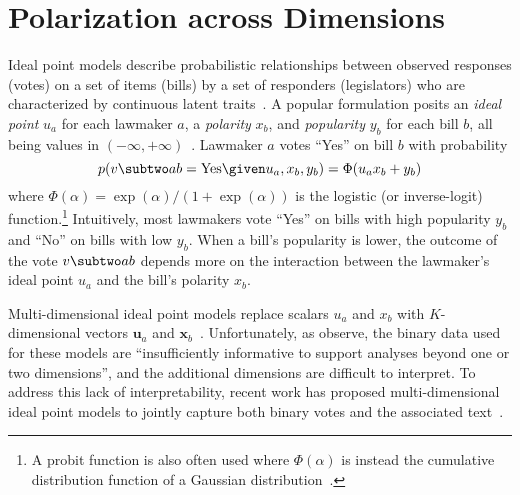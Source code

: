\section{Polarization across Dimensions}
\label{subsec:c6_idealpoint_overview}

Ideal point models describe probabilistic
relationships between observed responses (votes) on a set of items (bills) by a set of
responders (legislators) who are characterized by continuous latent
traits~\cite{Fox:Book10}.  A popular formulation posits an
\textit{ideal point} $u_a$ for each lawmaker $a$, a \textit{polarity}
$x_b$, and \textit{popularity} $y_b$ for each bill $b$, all being
values in
$(-\infty,+\infty)$~\cite{Martin:PA02,Bafumi:PA05,Gerrish:ICML11}. Lawmaker
$a$ votes ``Yes'' on bill $b$ with probability
\begin{equation}
  p(v \subtwo ab = \mbox{Yes} \given u_a, x_b, y_b) = \Phi(u_a x_b + y_b)
  \label{eqn:c6_onedim}
\end{equation}
where $\Phi(\alpha) = \exp(\alpha) / (1 + \exp(\alpha))$ is the
logistic (or inverse-logit) function.\footnote{A probit function is
  also often used where $\Phi(\alpha)$ is instead the cumulative
  distribution function of a Gaussian
  distribution~\cite{Martin:PA02}.} Intuitively, most lawmakers
vote ``Yes'' on bills with high popularity $y_b$ and ``No'' on bills
with low $y_b$. When a bill's popularity is lower, the outcome of
the vote $v \subtwo ab$ depends more on the interaction between the lawmaker's ideal
point $u_a$ and the bill's polarity $x_b$.

Multi-dimensional ideal point models replace scalars $u_a$ and $x_b$
with $K$-dimensional vectors $\bm u_a$ and $\bm
x_b$~\cite{Heckman:NBER96,Jackman:PA01,Clinton:APSR04}.
Unfortunately, as  observe, the binary data
used for these models are ``insufficiently informative to support
analyses beyond one or two dimensions'', and the additional dimensions
are difficult to interpret.  To address this lack of interpretability, recent work has proposed multi-dimensional ideal point models to jointly capture both binary votes and the associated text~\cite{Gerrish:NIPS12,Gu:KDD14,Lauderdale:AJPS14,Sim:AAAI15:utility}.

